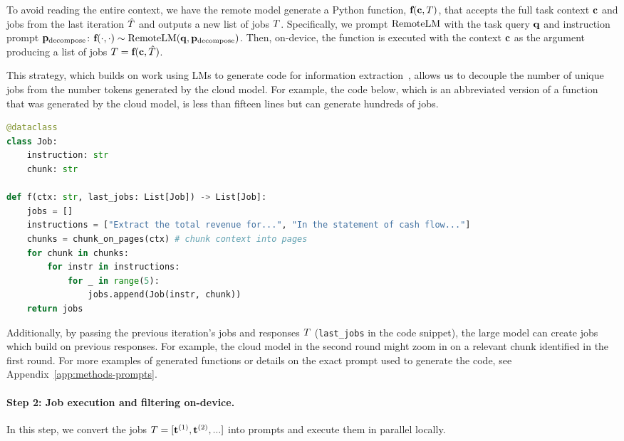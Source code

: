 To avoid reading the entire context, we have the remote model generate a Python function, $\textbf{f}(\mathbf{c}, T)$, that accepts the full task context $\mathbf{c}$ and jobs from the last iteration $\hat{T}$ and outputs a new list of jobs $T$. Specifically, we prompt $\mathrm{RemoteLM}$ with the task query $\mathbf{q}$ and instruction prompt $\mathbf{p}_{\text{decompose}}$:
    $\textbf{f}(\cdot, \cdot) \sim \mathrm{RemoteLM}(\mathbf{q}, \mathbf{p}_{\text{decompose}})$. 
Then, on-device, the function is executed with the context $\mathbf{c}$ as the argument producing a list of jobs $T = \textbf{f}(\mathbf{c}, \hat{T})$.

This strategy, which builds on work using LMs to generate code for information extraction~\citep{arora2023evaporate,li2023chain}, allows us to decouple the number of unique jobs from the number tokens generated by the cloud model.
For example, the code below, which is an abbreviated version of a function that was generated by the cloud model, is less than fifteen lines but can generate hundreds of jobs. 
\begin{exampleboxcode}
\begin{lstlisting}[language=Python]
@dataclass
class Job:
    instruction: str
    chunk: str
    
def f(ctx: str, last_jobs: List[Job]) -> List[Job]:
    jobs = []
    instructions = ["Extract the total revenue for...", "In the statement of cash flow..."]
    chunks = chunk_on_pages(ctx) # chunk context into pages
    for chunk in chunks:
        for instr in instructions:
            for _ in range(5):
                jobs.append(Job(instr, chunk))
    return jobs
\end{lstlisting}
\end{exampleboxcode}

Additionally, by passing the previous iteration's jobs and responses $T$ (\texttt{last\_jobs} in the code snippet), the large model can create jobs which build on previous responses. For example, the cloud model in the second round might zoom in on a relevant chunk identified in the first round.
For more examples of generated functions or details on the exact prompt used to generate the code, see Appendix~\ref{app:methods-prompts}. 
    
\vspace{-0.5em}\paragraph{Step 2: Job execution and filtering on-device.} 
In this step, we convert the jobs $T = [ \mathbf{t}^{(1)}, \mathbf{t}^{(2)}, ... ]$ into prompts and execute them in parallel locally. 

